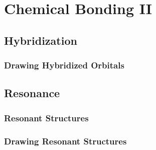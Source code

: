 \documentclass[../main]{subfiles}
\begin{document}
\section{Chemical Bonding II}

	\subsection{Hybridization}

	\subsubsection{Drawing Hybridized Orbitals}

	\subsection{Resonance}

	\subsubsection{Resonant Structures}

	\subsubsection{Drawing Resonant Structures}
\end{document}
